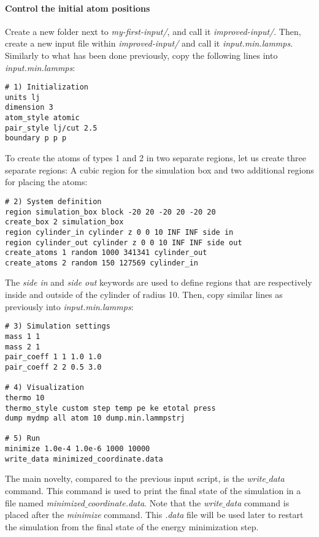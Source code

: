 \paragraph{Control the initial atom positions}
\noindent Create a new folder next to \textit{my-first-input/}, and call it \textit{improved-input/}. Then, create a new input file within \textit{improved-input/} and call it \textit{input.min.lammps}. Similarly to what has been done previously, copy the following lines into \textit{input.min.lammps}:
\begin{verbatim}
# 1) Initialization
units lj
dimension 3
atom_style atomic
pair_style lj/cut 2.5
boundary p p p
\end{verbatim}
To create the atoms of types 1 and 2 in two separate regions, let us create three separate regions: A cubic region for the simulation box and two additional regions for placing the atoms:
\begin{verbatim}
# 2) System definition
region simulation_box block -20 20 -20 20 -20 20
create_box 2 simulation_box
region cylinder_in cylinder z 0 0 10 INF INF side in
region cylinder_out cylinder z 0 0 10 INF INF side out
create_atoms 1 random 1000 341341 cylinder_out
create_atoms 2 random 150 127569 cylinder_in
\end{verbatim}
The \textit{side in} and \textit{side out} keywords are used to define regions that are respectively inside and outside of the cylinder of radius 10. Then, copy similar lines as previously into \textit{input.min.lammps}:
\begin{verbatim}
# 3) Simulation settings
mass 1 1
mass 2 1
pair_coeff 1 1 1.0 1.0
pair_coeff 2 2 0.5 3.0

# 4) Visualization
thermo 10
thermo_style custom step temp pe ke etotal press
dump mydmp all atom 10 dump.min.lammpstrj

# 5) Run
minimize 1.0e-4 1.0e-6 1000 10000
write_data minimized_coordinate.data
\end{verbatim}
The main novelty, compared to the previous input script, is the \textit{write$\_$data} command. This command is used to print the final state of the simulation in a file named \textit{minimized$\_$coordinate.data}. Note that the \textit{write$\_$data} command is placed after the \textit{minimize} command. This \textit{.data} file will be used later to restart the simulation from the final state of the energy minimization step.

